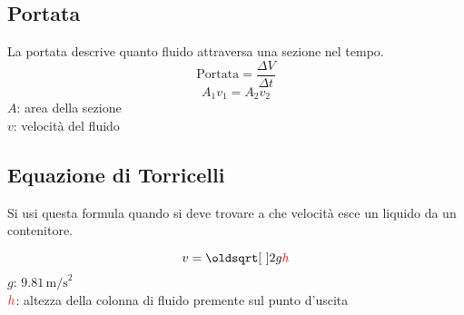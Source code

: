 \subsection{Portata}
La portata descrive quanto fluido attraversa una sezione nel tempo.
\begin{equation*}
  \text{Portata} = \frac{\Delta V}{\Delta t} 
\end{equation*}
\begin{equation*}
  A_1v_1=A_2v_2
\end{equation*}
$A$: area della sezione\\
$v$: velocità del fluido

\subsection{Equazione di Torricelli}
Si usi questa formula quando si deve trovare a che velocità esce un liquido da un contenitore.
\begin{center}
\end{center}
\begin{equation*}
v = \sqrt{2g\mathcolor{red}{h}}
\end{equation*}
\hyperref[tab:g]{$g$}: $9.81\,\text{m/s}^2$\\
$\mathcolor{red}{h}$: altezza della colonna di fluido premente sul punto d'uscita
